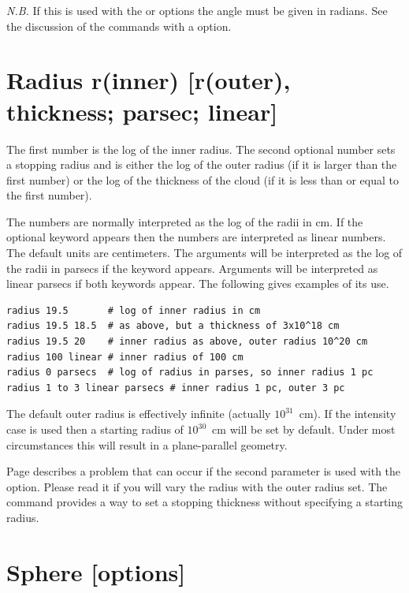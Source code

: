 \emph{N.B.}  If this is used with the  or
 options the angle must be given in radians.
See the discussion of the commands with a  option.

\section{Radius r(inner)  [r(outer), thickness; parsec; linear]}
\label{sec:RadiusCommand}

The first number is the log of the inner radius.
The second optional
number sets a stopping radius and is either the log of the
outer radius
(if it is larger than the first number) or the log of the thickness of the
cloud (if it is less than or equal to the first number).

The numbers are normally interpreted as the log of the radii in cm.
If the optional keyword  appears then
the numbers are interpreted
as linear numbers.
The default units are centimeters.
The arguments will
be interpreted as the log of the radii in parsecs if the keyword
 appears.
Arguments will be interpreted as linear parsecs if both keywords
appear.
The following gives examples of its use.
\begin{verbatim}
radius 19.5       # log of inner radius in cm
radius 19.5 18.5  # as above, but a thickness of 3x10^18 cm
radius 19.5 20    # inner radius as above, outer radius 10^20 cm
radius 100 linear # inner radius of 100 cm
radius 0 parsecs  # log of radius in parses, so inner radius 1 pc
radius 1 to 3 linear parsecs # inner radius 1 pc, outer 3 pc
\end{verbatim}

The default outer radius is effectively infinite (actually $10^{31}$~cm).
If the intensity case is used then a starting radius of $10^{30}$~cm
will be set by default.
Under most circumstances this will result in a
plane-parallel geometry.

Page \pageref{sec:RadiusVaryOptions} describes a problem
that can occur if the second parameter is used with the
 option.
Please read it if you will vary the radius
with the outer radius set.
The  command provides a way to set
a stopping thickness without specifying a starting radius.

\section{Sphere [options]}
\label{sec:CommandSphere}


